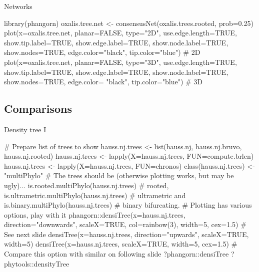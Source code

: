 \documentclass[compress, ucs, xelatex, 11pt, xcolor=svgnames, aspectratio=169,
	hyperref={
		bookmarks=true,
		unicode=true,
		colorlinks=true,
		pdftitle={Molecular data in R},
		plainpages=false,
		pdfauthor={Vojtech Zeisek},
		pdfsubject={Course about phylogeny and evolution in R},
		pdfcreator={XeLaTeX},
		pdfkeywords={R, evolution, phylogeny, molecular data},
		linkcolor=Crimson, %
		anchorcolor=Magenta, %
		citecolor=Magenta, %
		filecolor=Magenta, %
		menucolor=Magenta, %
		urlcolor=DodgerBlue, %
		pdftex},
	url={hyphens, lowtilde} %
	]{beamer}
\renewcommand{\texttt}[1]{\colorbox{Beige}{{\ttfamily #1}}}
\begin{document}
%

\begin{frame}[fragile]{Networks}
	\begin{spluscode}
    library(phangorn)
    oxalis.tree.net <- consensusNet(oxalis.trees.rooted, prob=0.25)
    plot(x=oxalis.tree.net, planar=FALSE, type="2D", use.edge.length=TRUE,
      show.tip.label=TRUE, show.edge.label=TRUE, show.node.label=TRUE,
      show.nodes=TRUE, edge.color="black", tip.color="blue") # 2D
    plot(x=oxalis.tree.net, planar=FALSE, type="3D", use.edge.length=TRUE,
      show.tip.label=TRUE, show.edge.label=TRUE, show.node.label=TRUE,
      show.nodes=TRUE, edge.color= "black", tip.color="blue") # 3D
	\end{spluscode}
	\begin{center}
		\texttt{[image: oxalis-net.png]}
	\end{center}
\end{frame}

\subsection{Comparisons}

\begin{frame}[fragile]{Density tree I}
	\begin{spluscode}
    # Prepare list of trees to show
    hauss.nj.trees <- list(hauss.nj, hauss.nj.bruvo, hauss.nj.rooted)
    hauss.nj.trees <- lapply(X=hauss.nj.trees, FUN=compute.brlen)
    hauss.nj.trees <- lapply(X=hauss.nj.trees, FUN=chronos)
    class(hauss.nj.trees) <- "multiPhylo"
    # The trees should be (otherwise plotting works, but may be ugly)...
    is.rooted.multiPhylo(hauss.nj.trees) # rooted,
    is.ultrametric.multiPhylo(hauss.nj.trees) # ultrametric and
    is.binary.multiPhylo(hauss.nj.trees) # binary bifurcating.
    # Plotting has various options, play with it
    phangorn::densiTree(x=hauss.nj.trees, direction="downwards",
      scaleX=TRUE, col=rainbow(3), width=5, cex=1.5) # See next slide
    densiTree(x=hauss.nj.trees, direction="upwards", scaleX=TRUE, width=5)
    densiTree(x=hauss.nj.trees, scaleX=TRUE, width=5, cex=1.5)
    # Compare this option with similar on following slide
    ?phangorn::densiTree
    ?phytools::densityTree
	\end{spluscode}
\end{frame}
\end{document}
